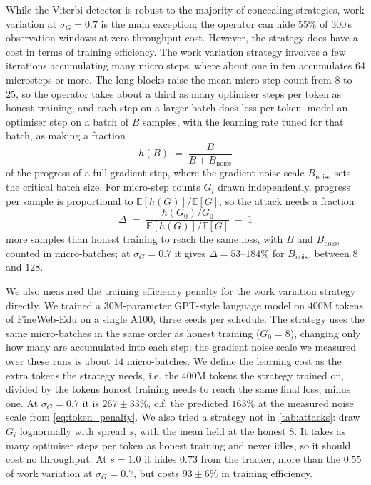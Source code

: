 \documentclass{article}
\begin{document}
While the Viterbi detector is robust to the majority of concealing strategies, work variation at $\sigma_G = 0.7$ is the main exception; the operator can hide 55\% of $300$\,s observation windows at zero throughput cost. However, the strategy does have a cost in terms of training efficiency. The work variation strategy involves a few iterations accumulating many micro steps, where about one in ten accumulates 64 microsteps or more. The long blocks raise the mean micro-step count from $8$ to $25$, so the operator takes about a third as many optimiser steps per token as honest training, and each step
on a larger batch does less per token. \citet{mccandlish2018empirical} model an
optimiser step on a batch of $B$ samples, with the learning rate tuned for that
batch, as making a fraction
\begin{equation}
	h(B) \;=\; \frac{B}{B + B_{\mathrm{noise}}}
	\label{eq:step_efficiency}
\end{equation}
of the progress of a full-gradient step, where the gradient noise scale
$B_{\mathrm{noise}}$ sets the critical batch size. For micro-step counts $G_i$
drawn independently, progress per sample is proportional to
$\mathbb{E}[h(G)]/\mathbb{E}[G]$, so the attack needs a fraction
\begin{equation}
	\Delta \;=\; \frac{h(G_0)/G_0}{\mathbb{E}[h(G)]/\mathbb{E}[G]} \;-\; 1
	\label{eq:token_penalty}
\end{equation}
more samples than honest training to reach the same loss, with $B$ and
$B_{\mathrm{noise}}$ counted in micro-batches; at $\sigma_G = 0.7$ it gives
$\Delta = 53$--$184\%$ for $B_{\mathrm{noise}}$ between $8$ and $128$.

We also measured the training efficiency penalty for the work variation strategy directly. We trained a $30$M-parameter GPT-style
language model on $400$M tokens of FineWeb-Edu \citep{penedo2024fineweb} on a
single A100, three seeds per schedule. The strategy uses the same micro-batches in
the same order as honest training ($G_0 = 8$), changing only how many are
accumulated into each step; the gradient noise scale we measured over these runs
is about $14$ micro-batches. We define the learning cost as the extra tokens
the strategy needs, i.e. the $400$M tokens the strategy trained on, divided by
the tokens honest training needs to reach the same final loss, minus one. At $\sigma_G = 0.7$ it is
$267 \pm 33\%$, c.f. the predicted $163\%$ at the measured noise scale from \cref{eq:token_penalty}. We also tried a strategy not in \cref{tab:attacks}: draw $G_i$ lognormally
with spread $s$, with the mean held at the honest $8$. It takes as many
optimiser steps per token as honest training and never idles, so it should cost
no throughput. At $s = 1.0$ it hides $0.73$ from the tracker, more than the
$0.55$ of work variation at $\sigma_G = 0.7$, but costs $93 \pm 6\%$ in
training efficiency. 
\end{document}
